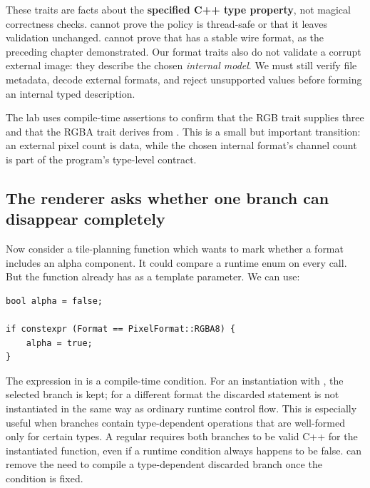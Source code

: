 These traits are facts about the \textbf{specified C++ type property}, not magical correctness checks.  cannot prove the policy is thread-safe or that it leaves validation unchanged.  cannot prove that  has a stable wire format, as the preceding chapter demonstrated. Our format traits also do not validate a corrupt external image: they describe the chosen \emph{internal model}. We must still verify file metadata, decode external formats, and reject unsupported values before forming an internal typed description.

The lab uses compile-time assertions to confirm that the RGB trait supplies three and that the RGBA trait derives from . This is a small but important transition: an external pixel count is data, while the chosen internal format's channel count is part of the program's type-level contract.

\subsection{The renderer asks whether one branch can disappear completely}\label{01-foundations-i-ch005-the-renderer-asks-whether-one-branch-can-disappear-completely}

\hypertarget{01-foundations-i-ch005-the-renderer-asks-whether-one-branch-can-disappear-completely}{}

Now consider a tile-planning function which wants to mark whether a format includes an alpha component. It could compare a runtime enum on every call. But the function already has  as a template parameter. We can use:

\begin{verbatim}
bool alpha = false;

if constexpr (Format == PixelFormat::RGBA8) {
    alpha = true;
}
\end{verbatim}

The expression in  is a compile-time condition. For an instantiation with , the selected branch is kept; for a different format the discarded statement is not instantiated in the same way as ordinary runtime control flow. This is especially useful when branches contain type-dependent operations that are well-formed only for certain types. A regular  requires both branches to be valid C++ for the instantiated function, even if a runtime condition always happens to be false.  can remove the need to compile a type-dependent discarded branch once the condition is fixed.

